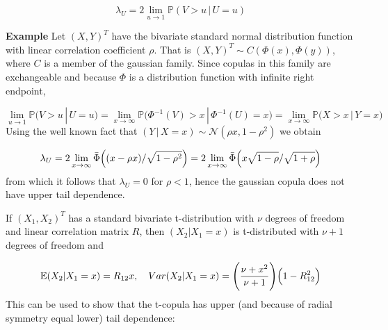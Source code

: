 \documentclass{article}
\begin{document}
\begin{equation}
\lambda_U =  2 \lim\limits_{u\rightarrow 1} \mathbb{P} (V > u\, |\, U = u)
\end{equation}

\noindent\textbf{Example} Let $(X, Y)^T$ have the bivariate standard normal distribution function with linear correlation coefficient $\rho$. That is $(X, Y)^T \sim C(\Phi(x), \Phi(y))$, where $C$ is a member of the gaussian family. Since copulas in this family are exchangeable and because $\Phi$ is a distribution function with infinite right endpoint,

\begin{equation}
    \lim\limits_{u\rightarrow 1}       \mathbb{P}\bigl(V > u\, |\, U = u \bigr)
=  \lim\limits_{x\rightarrow \infty} \mathbb{P}\bigl(\Phi^{-1}(V)>x\, |\,\Phi^{-1} (U) = x \bigr)
= \lim\limits_{x\rightarrow \infty} \mathbb{P}\bigl(X>x\, |\,Y = x \bigr)
\end{equation}
Using the well known fact that $(Y \,\vert \, X = x) \sim \mathcal{N}(\rho x, 1-\rho^2)$ we obtain

\begin{equation}
\lambda_U = 2 \lim\limits_{x\rightarrow \infty}\bar \Phi \Bigl( (x -\rho x)/\sqrt{1-\rho^2} \Bigr) =
2 \lim\limits_{x\rightarrow \infty}\bar \Phi \Bigl( x \sqrt{1-\rho}/\sqrt{1+\rho} \Bigr)
\end{equation}
from which it follows that $\lambda_U = 0$ for $\rho < 1$, hence the gaussian copula does not have upper tail dependence.


If $(X_1,X_2)^T$ has a standard bivariate t-distribution with $\nu$ degrees of freedom and linear correlation 
matrix $R$, then $(X_2 | X_1 = x)$ is t-distributed with $\nu + 1$ degrees of freedom and

$$
\mathbb{E} (X_2 | X_1 =x) = R_{12}x, \quad Var(X_2 | X_1 =x) = \Biggl( \frac{\nu+x^2}{\nu+1} \Biggr)\Bigl( 1 - R_{12}^2 \Bigr)
$$
This can be used to show that the t-copula has upper (and because of radial symmetry equal lower) tail dependence:
\end{document}

